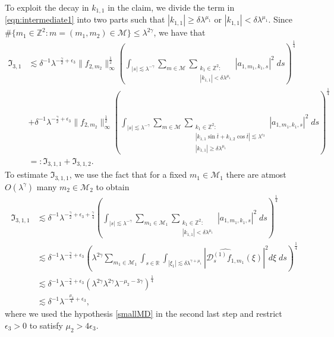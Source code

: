 \documentclass[a4paper,reqno]{amsart}
\theoremstyle{definition}
\theoremstyle{remark}
\numberwithin{equation}{section}
\newcommand{\R}{{\mathbb {R}}}
\newcommand{\Z}{{\mathbb Z}}
\begin{document}
	
	To exploit the decay in $k_{1,1}$ in the claim, we divide the term in \eqref{eqn:intermediate1} into two parts such that $|k_{1,1}|\geq\delta\lambda^{\mu_1}$ or $|k_{1,1}|<\delta\lambda^{\mu_1}$. Since $\#\{m_1\in\Z^2:{m}=(m_1,m_2)\in\mathcal{M}\}\leq\lambda^{2\gamma}$, we have that
	\begin{align*}
		\mathfrak{I}_{3,1}&\lesssim\delta^{-1}\lambda^{-\frac{\gamma}{2}+\epsilon_3}\|f_{2,m_2}\|_\infty^\frac{1}{2}\left(\int_{|s|\lesssim\lambda^{-\gamma}}\sum_{{m}\in\mathcal{M}}\sum_{\substack{k_1\in\Z^2:\\|k_{1,1}|<\delta\lambda^{\mu_1}}}|a_{1,m_1,k_1,s}|^2\;ds\right)^\frac{1}{4}\\
		&+\delta^{-1}\lambda^{-\frac{\gamma}{2}+\epsilon_3}\|f_{2,m_2}\|_\infty^\frac{1}{2}\left(\int_{|s|\lesssim\lambda^{-\gamma}}\sum_{{m}\in\mathcal{M}}\sum_{\substack{k_1\in\Z^2:\\|k_{1,1}\sin\bar t+k_{1,2}\cos\bar t|\lesssim\lambda^{\epsilon_3}\\|k_{1,1}|\geq\delta\lambda^{\mu_1}}}|a_{1,m_1,k_1,s}|^2\;ds\right)^\frac{1}{4}\\
		&=:\mathfrak{I}_{3,1,1}+\mathfrak{I}_{3,1,2}.
	\end{align*}
	To estimate $\mathfrak{I}_{3,1,1}$, we use the fact that for a fixed $m_1\in\mathcal{M}_1$ there are atmost $O(\lambda^{\gamma})$ many $m_2\in\mathcal{M}_2$ to obtain
	\begin{align*}
		\mathfrak{I}_{3,1,1}&\lesssim\delta^{-1}\lambda^{-\frac{\gamma}{2}+\epsilon_3+\frac{\gamma}{4}}\left(\int_{|s|\lesssim\lambda^{-\gamma}}\sum_{m_1\in\mathcal{M}_1}\sum_{\substack{k_1\in\Z^2:\\|k_{1,1}|<\delta\lambda^{\mu_1}}}|a_{1,m_1,k_1,s}|^2\;ds\right)^\frac{1}{4}\\
		&\lesssim\delta^{-1}\lambda^{-\frac{\gamma}{4}+\epsilon_3}\left(\lambda^{2\gamma}\sum_{m_1\in\mathcal{M}_1}\int_{s\in\R}\int_{|\xi_1|\lesssim\delta\lambda^{\gamma+\mu_1}}\left|\widehat{\mathscr{D}_s^{(1)} f_{1, m_1}}(\xi)\right|^2 d \xi\;ds\right)^\frac{1}{4}\\
		&\lesssim\delta^{-1}\lambda^{-\frac{\gamma}{4}+\epsilon_3}\left(\lambda^{2\gamma}\lambda^{2\gamma}\lambda^{-\mu_2-3\gamma}\right)^\frac{1}{4}\\
		&\lesssim\delta^{-1}\lambda^{-\frac{\mu_2}{4}+\epsilon_3},
	\end{align*}
	where we used the hypothesis \eqref{smallMD} in the second last step and restrict $\epsilon_3>0$ to satisfy $\mu_2>4\epsilon_3$.
	
\end{document}
